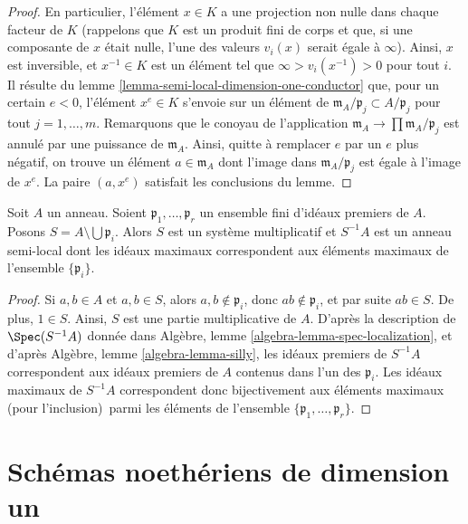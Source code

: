 \begin{proof}
\medskip\noindent
En particulier, l'élément $x \in K$ a une projection non nulle
dans chaque facteur de $K$ (rappelons que $K$ est un produit fini de
corps et que, si une composante de $x$ était nulle, l'une
des valeurs $v_i(x)$ serait égale à $\infty$). Ainsi, $x$ est
inversible, et $x^{-1} \in K$ est un élément tel que
$\infty > v_i(x^{-1}) > 0$ pour tout $i$. Il résulte du
lemme \ref{lemma-semi-local-dimension-one-conductor} que,
pour un certain $e < 0$, l'élément $x^e \in K$ s'envoie sur un élément de
$\mathfrak m_A/\mathfrak p_j \subset A/\mathfrak p_j$ pour tout
$j = 1, \ldots, m$. Remarquons que le conoyau de l'application
$\mathfrak m_A \to \prod \mathfrak m_A/\mathfrak p_j$ est annulé
par une puissance de $\mathfrak m_A$. Ainsi, quitte à remplacer
$e$ par un $e$ plus négatif, on trouve un élément $a \in \mathfrak m_A$
dont l'image dans $\mathfrak m_A/\mathfrak p_j$ est égale à
l'image de $x^e$. La paire $(a, x^e)$ satisfait les
conclusions du lemme.
\end{proof}

\begin{lemma}
\label{lemma-localization-semi-local}
Soit $A$ un anneau. Soient $\mathfrak p_1, \ldots, \mathfrak p_r$
un ensemble fini d'idéaux premiers de $A$. Posons
$S = A \setminus \bigcup \mathfrak p_i$. Alors $S$ est un système multiplicatif
et $S^{-1}A$ est un anneau semi-local dont les idéaux maximaux
correspondent aux éléments maximaux de l'ensemble $\{\mathfrak p_i\}$.
\end{lemma}

\begin{proof}
Si $a, b \in A$ et $a, b \in S$, alors $a, b \not \in \mathfrak p_i$,
donc $ab \not \in \mathfrak p_i$, et par suite $ab \in S$. De plus, $1 \in S$.
Ainsi, $S$ est une partie multiplicative de $A$. D'après la description de
$\Spec(S^{-1}A)$ donnée dans
Algèbre, lemme \ref{algebra-lemma-spec-localization},
et d'après
Algèbre, lemme \ref{algebra-lemma-silly},
les idéaux premiers de $S^{-1}A$ correspondent aux idéaux premiers de
$A$ contenus dans l'un des $\mathfrak p_i$.
Les idéaux maximaux de $S^{-1}A$ correspondent donc bijectivement aux
éléments maximaux (pour l'inclusion)\ parmi les éléments de l'ensemble
$\{\mathfrak p_1, \ldots, \mathfrak p_r\}$.
\end{proof}




\section{Schémas noethériens de dimension un}
\label{section-dimension-one}

